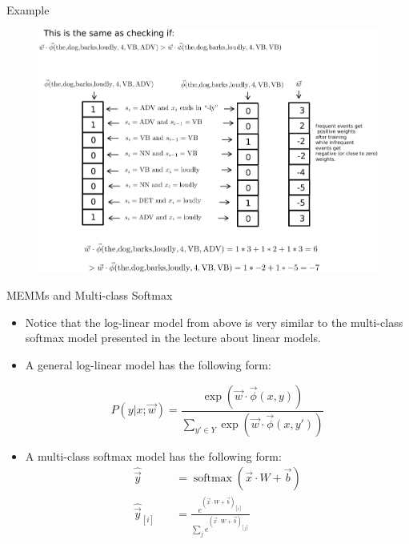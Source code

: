 \documentclass[handout]{beamer}
\begin{document}
\begin{frame}{Example}
  \begin{figure}[h]
        	\includegraphics[scale = 0.6]{pics/CRF2.pdf}
        \end{figure}
\end{frame}




\begin{frame}{MEMMs and Multi-class Softmax}
\begin{scriptsize}
\begin{itemize}
\item Notice that the log-linear model from above is very similar to the multi-class softmax model presented in the lecture about linear models.

\item A general log-linear model has the following form:

\begin{displaymath}
 P( y | x; \vec{w}) = \frac{\exp (\vec{w}\cdot \vec{\phi}(x,y))}{\sum_{y' \in Y} \exp (\vec{w}\cdot \vec{\phi}(x,y'))}
\end{displaymath}


\item A multi-class softmax model has the following form:
\begin{equation}
\begin{split}
\hat{\vec{y}} \quad & =  \operatorname{softmax}(\vec{x} \cdot W + \vec{b})  \\
\hat{\vec{y}}_{[i]} \quad & = \frac{e^{(\vec{x} \cdot W + \vec{b})_{[i]}}}{\sum_j e^{(\vec{x} \cdot W + \vec{b})_{[j]}}}
\end{split}
\end{equation}

 
\end{itemize}


\end{scriptsize}
\end{frame}
\end{document}
